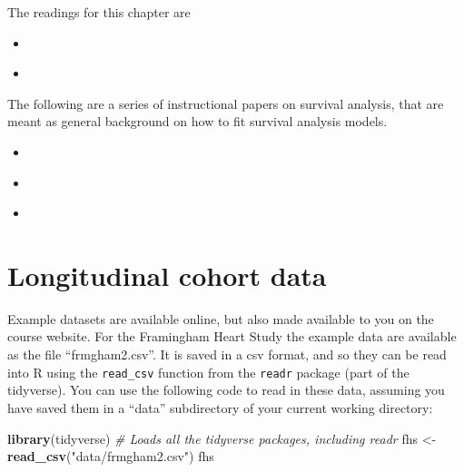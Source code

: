 \documentclass[
]{book}
\newenvironment{Shaded}{\begin{snugshade}}{\end{snugshade}}
\newcommand{\CommentTok}[1]{\textcolor[rgb]{0.56,0.35,0.01}{\textit{#1}}}
\newcommand{\KeywordTok}[1]{\textcolor[rgb]{0.13,0.29,0.53}{\textbf{#1}}}
\newcommand{\NormalTok}[1]{#1}
\newcommand{\StringTok}[1]{\textcolor[rgb]{0.31,0.60,0.02}{#1}}
\begin{document}
The readings for this chapter are

\begin{itemize}
\item
  \citet{andersson201970}
\item
  \citet{wong1989risk}
\end{itemize}

The following are a series of instructional papers on survival analysis, that are
meant as general background on how to fit survival analysis models.

\begin{itemize}
\item
  \citet{clark2003survival}
\item
  \citet{bradburn2003survival}
\item
  \citet{bradburn2003survival2}
\end{itemize}

\hypertarget{longitudinal-cohort-data}{%
\section{Longitudinal cohort data}\label{longitudinal-cohort-data}}

Example datasets are available online, but also made available to you on the course
website. For the Framingham Heart Study the example data are available as the file
``frmgham2.csv''. It is saved in a csv format, and so they can be read into R using the
\texttt{read\_csv} function from the \texttt{readr} package (part of the tidyverse). You can use the following code to read in these data, assuming you have saved them in a ``data'' subdirectory of your current
working directory:

\begin{Shaded}
\begin{Highlighting}[]
\KeywordTok{library}\NormalTok{(tidyverse) }\CommentTok{# Loads all the tidyverse packages, including readr}
\NormalTok{fhs <-}\StringTok{ }\KeywordTok{read_csv}\NormalTok{(}\StringTok{"data/frmgham2.csv"}\NormalTok{)}
\NormalTok{fhs}
\end{Highlighting}
\end{Shaded}
\end{document}

